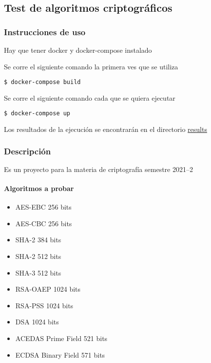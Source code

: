 \documentclass[../main.tex]{subfiles}
\begin{document}
\hypertarget{test-de-algoritmos-criptograficos}{%
  \subsection{Test de algoritmos
    criptográficos}\label{test-de-algoritmos-criptograficos}}

\hypertarget{instrucciones-de-uso}{%
  \subsubsection{Instrucciones de uso}\label{instrucciones-de-uso}}

Hay que tener docker y docker-compose instalado

Se corre el siguiente comando la primera ves que se utiliza


\begin{code}
\begin{verbatim}
$ docker-compose build
\end{verbatim}
\end{code}

Se corre el siguiente comando cada que se quiera ejecutar

\begin{code}
\begin{verbatim}
$ docker-compose up
\end{verbatim}
\end{code}

Los resultados de la ejecución se encontrarán en el directorio
\href{./results}{results}

\hypertarget{descripciuxf3n}{%
  \subsubsection{Descripción}\label{descripciuxf3n}}

Es un proyecto para la materia de criptografía semestre 2021--2

\hypertarget{algoritmos-a-probar}{%
  \paragraph{Algoritmos a probar}\label{algoritmos-a-probar}}

\begin{itemize}
        \tightlist{}
  \item
        AES-EBC 256 bits
  \item
        AES-CBC 256 bits
  \item
        SHA-2 384 bits
  \item
        SHA-2 512 bits
  \item
        SHA-3 512 bits
  \item
        RSA-OAEP 1024 bits
  \item
        RSA-PSS 1024 bits
  \item
        DSA 1024 bits
  \item
        ACEDAS Prime Field 521 bits
  \item
        ECDSA Binary Field 571 bits
\end{itemize}
\end{document}
